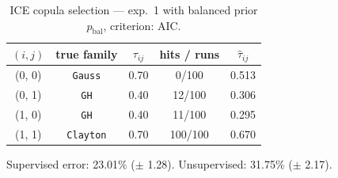 \begin{table}[htbp]
  \centering
  \caption{ICE copula selection — exp.\ 1 with balanced prior $p_{\text{bal}}$, criterion: AIC.}
  \label{tab:exp3-exp1_bal_p__aic}
  \begin{tabular}{ccccc}
    \toprule
    $(i, j)$ & true family & $\tau_{ij}$ & hits / runs & $\hat\tau_{ij}$ \\
    \midrule
    (0, 0) & \texttt{Gauss} & 0.70 & 0/100 & 0.513 \\
    (0, 1) & \texttt{GH} & 0.40 & 12/100 & 0.306 \\
    (1, 0) & \texttt{GH} & 0.40 & 11/100 & 0.295 \\
    (1, 1) & \texttt{Clayton} & 0.70 & 100/100 & 0.670 \\
    \bottomrule
  \end{tabular}
  \par\smallskip Supervised error: 23.01\% ($\pm$ 1.28). Unsupervised: 31.75\% ($\pm$ 2.17).
\end{table}

